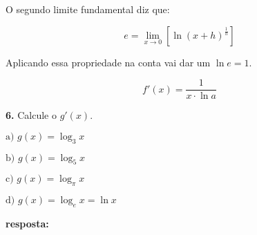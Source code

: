 \documentclass[article,12pt,oneside,a4paper,brazil]{abntex2}
\begin{document}
\begin{flushleft}
		O segundo limite fundamental diz que:
		
		\begin{equation*}
			e = \lim_{x \rightarrow 0} \left[ \ln \left( {x + h}\right)^{\frac{1}{h}} \right]
		\end{equation*}
		
		Aplicando essa propriedade na conta vai dar um $\ln{e} = 1$.
		
		\begin{equation*}
			f'(x) = \frac{1}{x \cdot \ln{a}}
		\end{equation*}
		
		
		\vspace{1em}
		
		\textbf{6.} Calcule o $g'(x)$.
		
		\begin{adjustwidth}{0.5cm}{0cm}
			$\text{a) } g(x) = \log_{3}{x}$
			
			$\text{b) } g(x) = \log_{5}{x}$
			
			$\text{c) } g(x) = \log_{\pi}{x}$
			
			$\text{d) } g(x) = \log_{e}{x} = \ln{x}$
		\end{adjustwidth}	
		
		\textbf{resposta:}
		
		
		\vspace{1em}
	\end{flushleft}
	

	
	
\end{document}
